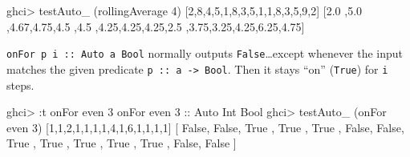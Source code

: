 \documentclass[]{article}
\newenvironment{Shaded}{}{}
\newcommand{\DataTypeTok}[1]{\textcolor[rgb]{0.56,0.13,0.00}{{#1}}}
\newcommand{\DecValTok}[1]{\textcolor[rgb]{0.25,0.63,0.44}{{#1}}}
\newcommand{\FloatTok}[1]{\textcolor[rgb]{0.25,0.63,0.44}{{#1}}}
\newcommand{\OtherTok}[1]{\textcolor[rgb]{0.00,0.44,0.13}{{#1}}}
\newcommand{\FunctionTok}[1]{\textcolor[rgb]{0.02,0.16,0.49}{{#1}}}
\newcommand{\NormalTok}[1]{{#1}}
\renewcommand{\href}[2]{#2\footnote{\url{#1}}}
\begin{document}
\begin{Shaded}
\begin{Highlighting}[]
\NormalTok{ghci}\FunctionTok{>} \NormalTok{testAuto_ (rollingAverage }\DecValTok{4}\NormalTok{) [}\DecValTok{2}\NormalTok{,}\DecValTok{8}\NormalTok{,}\DecValTok{4}\NormalTok{,}\DecValTok{5}\NormalTok{,}\DecValTok{1}\NormalTok{,}\DecValTok{8}\NormalTok{,}\DecValTok{3}\NormalTok{,}\DecValTok{5}\NormalTok{,}\DecValTok{1}\NormalTok{,}\DecValTok{1}\NormalTok{,}\DecValTok{8}\NormalTok{,}\DecValTok{3}\NormalTok{,}\DecValTok{5}\NormalTok{,}\DecValTok{9}\NormalTok{,}\DecValTok{2}\NormalTok{]}
\NormalTok{[}\FloatTok{2.0} \NormalTok{,}\FloatTok{5.0} \NormalTok{,}\FloatTok{4.67}\NormalTok{,}\FloatTok{4.75}\NormalTok{,}\FloatTok{4.5}
\NormalTok{,}\FloatTok{4.5} \NormalTok{,}\FloatTok{4.25}\NormalTok{,}\FloatTok{4.25}\NormalTok{,}\FloatTok{4.25}\NormalTok{,}\FloatTok{2.5}
\NormalTok{,}\FloatTok{3.75}\NormalTok{,}\FloatTok{3.25}\NormalTok{,}\FloatTok{4.25}\NormalTok{,}\FloatTok{6.25}\NormalTok{,}\FloatTok{4.75}\NormalTok{]}
\end{Highlighting}
\end{Shaded}

\begin{description}
\tightlist
\item[\href{https://github.com/mstksg/inCode/tree/master/code-samples/machines/Auto.hs\#L125-146}{onFor}]
\texttt{onFor\ p\ i\ ::\ Auto\ a\ Bool} normally outputs
\texttt{False}\ldots{}except whenever the input matches the given
predicate \texttt{p\ ::\ a\ -\textgreater{}\ Bool}. Then it stays ``on''
(\texttt{True}) for \texttt{i} steps.
\end{description}

\begin{Shaded}
\begin{Highlighting}[]
\NormalTok{ghci}\FunctionTok{>} \FunctionTok{:}\NormalTok{t onFor even }\DecValTok{3}
\NormalTok{onFor even }\DecValTok{3}\OtherTok{ ::} \DataTypeTok{Auto} \DataTypeTok{Int} \DataTypeTok{Bool}
\NormalTok{ghci}\FunctionTok{>} \NormalTok{testAuto_ (onFor even }\DecValTok{3}\NormalTok{) [}\DecValTok{1}\NormalTok{,}\DecValTok{1}\NormalTok{,}\DecValTok{2}\NormalTok{,}\DecValTok{1}\NormalTok{,}\DecValTok{1}\NormalTok{,}\DecValTok{1}\NormalTok{,}\DecValTok{1}\NormalTok{,}\DecValTok{4}\NormalTok{,}\DecValTok{1}\NormalTok{,}\DecValTok{6}\NormalTok{,}\DecValTok{1}\NormalTok{,}\DecValTok{1}\NormalTok{,}\DecValTok{1}\NormalTok{,}\DecValTok{1}\NormalTok{]}
\NormalTok{[ }\DataTypeTok{False}\NormalTok{, }\DataTypeTok{False}\NormalTok{, }\DataTypeTok{True} \NormalTok{, }\DataTypeTok{True} \NormalTok{, }\DataTypeTok{True}
\NormalTok{, }\DataTypeTok{False}\NormalTok{, }\DataTypeTok{False}\NormalTok{, }\DataTypeTok{True} \NormalTok{, }\DataTypeTok{True} \NormalTok{, }\DataTypeTok{True}
\NormalTok{, }\DataTypeTok{True} \NormalTok{, }\DataTypeTok{True} \NormalTok{, }\DataTypeTok{False}\NormalTok{, }\DataTypeTok{False} \NormalTok{]}
\end{Highlighting}
\end{Shaded}
\end{document}
